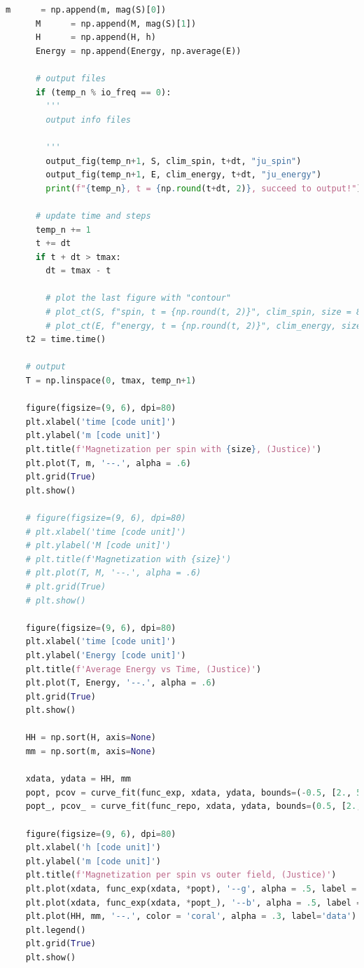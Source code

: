 \documentclass[10pt]{article}
\begin{document}
\begin{lstlisting}[language={Python}]
      m      = np.append(m, mag(S)[0])
      M      = np.append(M, mag(S)[1])
      H      = np.append(H, h)
      Energy = np.append(Energy, np.average(E))

      # output files
      if (temp_n % io_freq == 0):
        '''
        output info files

        '''
        output_fig(temp_n+1, S, clim_spin, t+dt, "ju_spin")
        output_fig(temp_n+1, E, clim_energy, t+dt, "ju_energy")
        print(f"{temp_n}, t = {np.round(t+dt, 2)}, succeed to output!")

      # update time and steps
      temp_n += 1
      t += dt
      if t + dt > tmax:
        dt = tmax - t

        # plot the last figure with "contour"
        # plot_ct(S, f"spin, t = {np.round(t, 2)}", clim_spin, size = 8, dpi = 80)
        # plot_ct(E, f"energy, t = {np.round(t, 2)}", clim_energy, size = 8, dpi = 80)
    t2 = time.time()
    
    # output
    T = np.linspace(0, tmax, temp_n+1)
    
    figure(figsize=(9, 6), dpi=80)
    plt.xlabel('time [code unit]')
    plt.ylabel('m [code unit]')
    plt.title(f'Magnetization per spin with {size}, (Justice)')
    plt.plot(T, m, '--.', alpha = .6)
    plt.grid(True)
    plt.show()
    
    # figure(figsize=(9, 6), dpi=80)
    # plt.xlabel('time [code unit]')
    # plt.ylabel('M [code unit]')
    # plt.title(f'Magnetization with {size}')
    # plt.plot(T, M, '--.', alpha = .6)
    # plt.grid(True)
    # plt.show()
    
    figure(figsize=(9, 6), dpi=80)
    plt.xlabel('time [code unit]')
    plt.ylabel('Energy [code unit]')
    plt.title(f'Average Energy vs Time, (Justice)')
    plt.plot(T, Energy, '--.', alpha = .6)
    plt.grid(True)
    plt.show()
    
    HH = np.sort(H, axis=None)
    mm = np.sort(m, axis=None)

    xdata, ydata = HH, mm
    popt, pcov = curve_fit(func_exp, xdata, ydata, bounds=(-0.5, [2., 50., 2., 1.]))
    popt_, pcov_ = curve_fit(func_repo, xdata, ydata, bounds=(0.5, [2., 10., 2., 1.]), p0=([2,5,1,0.6])) 

    figure(figsize=(9, 6), dpi=80)
    plt.xlabel('h [code unit]')
    plt.ylabel('m [code unit]')
    plt.title(f'Magnetization per spin vs outer field, (Justice)')
    plt.plot(xdata, func_exp(xdata, *popt), '--g', alpha = .5, label = f'exp fit with \n popt = {np.round(popt, 2)}')
    plt.plot(xdata, func_exp(xdata, *popt_), '--b', alpha = .5, label = f'reciprocal fit with \n popt = {np.round(popt_,2)}')
    plt.plot(HH, mm, '--.', color = 'coral', alpha = .3, label='data')
    plt.legend()
    plt.grid(True)
    plt.show()
    

\end{lstlisting}
\end{document}
